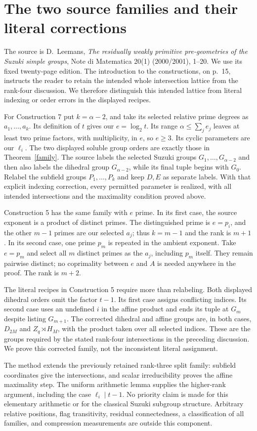 \documentclass[11pt,a4paper]{article}
\begin{document}
\section{The two source families and their literal corrections}
The source is D.~Leemans, \emph{The residually weakly primitive
pre-geometries of the Suzuki simple groups}, Note di Matematica
20(1) (2000/2001), 1--20. We use its fixed twenty-page edition.
The introduction to the constructions, on p.~15, instructs the reader
to retain the intended whole intersection lattice from the rank-four
discussion. We therefore distinguish this intended lattice from
literal indexing or order errors in the displayed recipes.

For Construction 7 put $k=\alpha-2$, and take its selected relative
prime degrees as $a_1,\ldots,a_k$. Its definition of $t$ gives our
$e=\log_2t$. Its range $\alpha\le\sum_j e_j$ leaves at least two
prime factors, with multiplicity, in $e$, so $e\ge3$. Its cyclic
parameters are our $\ell_i$. The two displayed soluble group orders
are exactly those in Theorem~\ref{family}. The source labels the
selected Suzuki groups $G_1,\ldots,G_{\alpha-2}$ and then also labels
the dihedral group $G_{\alpha-2}$, while its final tuple begins with
$G_0$. Relabel the subfield groups $P_1,\ldots,P_k$ and keep $D,E$
as separate labels. With that explicit indexing correction, every
permitted parameter is realized, with all intended intersections and
the maximality condition proved above.

Construction 5 has the same family with $e$ prime. In its first case,
the source exponent is a product of distinct primes. The distinguished
prime is $e=p_i$, and the other $m-1$ primes are our selected $a_j$;
thus $k=m-1$ and the rank is $m+1$. In its second case, one prime
$p_m$ is repeated in the ambient exponent. Take $e=p_m$ and select
all $m$ distinct primes as the $a_j$, including $p_m$ itself. They
remain pairwise distinct; no coprimality between $e$ and $A$ is needed
anywhere in the proof. The rank is $m+2$.

The literal recipes in Construction 5 require more than relabeling.
Both displayed dihedral orders omit the factor $t-1$. Its first case
assigns conflicting indices. Its second case uses an undefined $i$
in the affine product and ends its tuple at $G_m$ despite listing
$G_{m+1}$. The corrected dihedral and affine groups are, in both
cases, $D_{2M}$ and $Z_q\rtimes H_M$, with the product taken over
all selected indices. These are the groups required by the stated
rank-four intersections in the preceding discussion. We prove this
corrected family, not the inconsistent literal assignment.

The method extends the previously retained rank-three split family:
subfield coordinates give the intersections, and scalar irreducibility
proves the affine maximality step. The uniform arithmetic lemma supplies
the higher-rank argument, including the case $\ell_i\mid t-1$.
No priority claim is made for this elementary arithmetic or for the
classical Suzuki subgroup structure. Arbitrary relative positions,
flag transitivity, residual connectedness, a classification of all
families, and compression measurements are outside this component.
\end{document}
